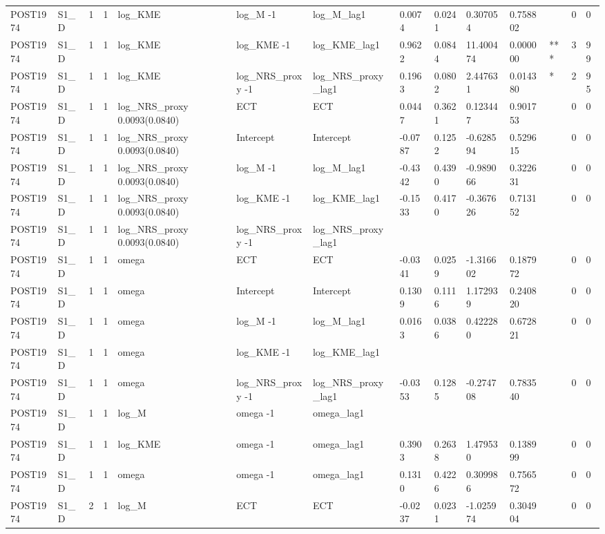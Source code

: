 \begin{tabular}{llllllllllllll}
POST1974 & S1\_D & 1 & 1 & log\_KME & log\_M -1 & log\_M\_lag1 & 0.0074 & 0.0241 & 0.307054 & 0.758802 &  & 0 & 0 \\
POST1974 & S1\_D & 1 & 1 & log\_KME & log\_KME -1 & log\_KME\_lag1 & 0.9622 & 0.0844 & 11.400474 & 0.000000 & *** & 3 & 99 \\
POST1974 & S1\_D & 1 & 1 & log\_KME & log\_NRS\_proxy -1 & log\_NRS\_proxy\_lag1 & 0.1963 & 0.0802 & 2.447631 & 0.014380 & * & 2 & 95 \\
POST1974 & S1\_D & 1 & 1 & log\_NRS\_proxy 0.0093(0.0840) & ECT & ECT & 0.0447 & 0.3621 & 0.123447 & 0.901753 &  & 0 & 0 \\
POST1974 & S1\_D & 1 & 1 & log\_NRS\_proxy 0.0093(0.0840) & Intercept & Intercept & -0.0787 & 0.1252 & -0.628594 & 0.529615 &  & 0 & 0 \\
POST1974 & S1\_D & 1 & 1 & log\_NRS\_proxy 0.0093(0.0840) & log\_M -1 & log\_M\_lag1 & -0.4342 & 0.4390 & -0.989066 & 0.322631 &  & 0 & 0 \\
POST1974 & S1\_D & 1 & 1 & log\_NRS\_proxy 0.0093(0.0840) & log\_KME -1 & log\_KME\_lag1 & -0.1533 & 0.4170 & -0.367626 & 0.713152 &  & 0 & 0 \\
POST1974 & S1\_D & 1 & 1 & log\_NRS\_proxy 0.0093(0.0840) & log\_NRS\_proxy -1 & log\_NRS\_proxy\_lag1 &  &  &  &  &  &  &  \\
POST1974 & S1\_D & 1 & 1 & omega & ECT & ECT & -0.0341 & 0.0259 & -1.316602 & 0.187972 &  & 0 & 0 \\
POST1974 & S1\_D & 1 & 1 & omega & Intercept & Intercept & 0.1309 & 0.1116 & 1.172939 & 0.240820 &  & 0 & 0 \\
POST1974 & S1\_D & 1 & 1 & omega & log\_M -1 & log\_M\_lag1 & 0.0163 & 0.0386 & 0.422280 & 0.672821 &  & 0 & 0 \\
POST1974 & S1\_D & 1 & 1 & omega & log\_KME -1 & log\_KME\_lag1 &  &  &  &  &  &  &  \\
POST1974 & S1\_D & 1 & 1 & omega & log\_NRS\_proxy -1 & log\_NRS\_proxy\_lag1 & -0.0353 & 0.1285 & -0.274708 & 0.783540 &  & 0 & 0 \\
POST1974 & S1\_D & 1 & 1 & log\_M & omega -1 & omega\_lag1 &  &  &  &  &  &  &  \\
POST1974 & S1\_D & 1 & 1 & log\_KME & omega -1 & omega\_lag1 & 0.3903 & 0.2638 & 1.479530 & 0.138999 &  & 0 & 0 \\
POST1974 & S1\_D & 1 & 1 & omega & omega -1 & omega\_lag1 & 0.1310 & 0.4226 & 0.309986 & 0.756572 &  & 0 & 0 \\
POST1974 & S1\_D & 2 & 1 & log\_M & ECT & ECT & -0.0237 & 0.0231 & -1.025974 & 0.304904 &  & 0 & 0 \\

\end{tabular}
